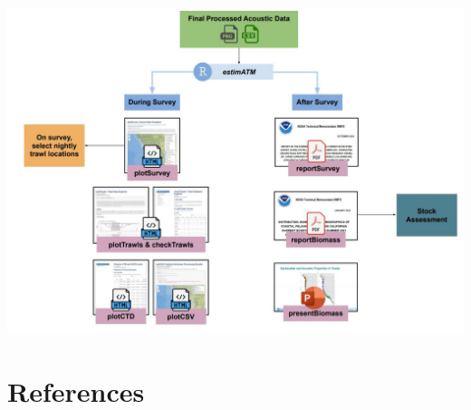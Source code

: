 \documentclass[
  letterpaper,
  oneside,
  open=any]{scrbook}
\begin{document}
\includegraphics{content/images/estimATM_dataflow.JPG}


\chapter*{References}\label{references}

\end{document}
